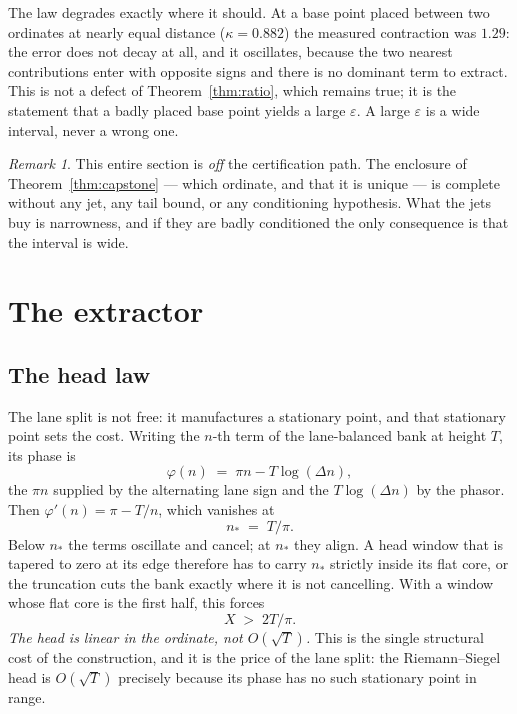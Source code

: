 \documentclass[11pt]{article}
\theoremstyle{plain}
\theoremstyle{definition}
\theoremstyle{remark}
\newtheorem{remark}[theorem]{Remark}
\begin{document}
The law degrades exactly where it should. At a base point placed between two ordinates
at nearly equal distance ($\kappa=0.882$) the measured contraction was $1.29$: the
error does not decay at all, and it oscillates, because the two nearest contributions
enter with opposite signs and there is no dominant term to extract. This is not a
defect of Theorem~\ref{thm:ratio}, which remains true; it is the statement that a
badly placed base point yields a large $\varepsilon$. A large $\varepsilon$ is a wide
interval, never a wrong one.

\begin{remark}
This entire section is \emph{off} the certification path. The enclosure of
Theorem~\ref{thm:capstone} --- which ordinate, and that it is unique --- is complete
without any jet, any tail bound, or any conditioning hypothesis. What the jets buy is
narrowness, and if they are badly conditioned the only consequence is that the
interval is wide.
\end{remark}

\section{The extractor}\label{sec:extractor}

\subsection{The head law}
The lane split is not free: it manufactures a stationary point, and that stationary
point sets the cost. Writing the $n$-th term of the lane-balanced bank at height $T$,
its phase is
\[
  \varphi(n)\;=\;\pi n-T\log(\Delta n),
\]
the $\pi n$ supplied by the alternating lane sign and the $T\log(\Delta n)$ by the
phasor. Then $\varphi'(n)=\pi-T/n$, which vanishes at
\[
  n_\ast \;=\; T/\pi .
\]
Below $n_\ast$ the terms oscillate and cancel; at $n_\ast$ they align. A head window
that is tapered to zero at its edge therefore has to carry $n_\ast$ strictly inside its
flat core, or the truncation cuts the bank exactly where it is not cancelling. With a
window whose flat core is the first half, this forces
\[
  X \;>\; 2T/\pi .
\]
\emph{The head is linear in the ordinate, not $O(\sqrt T)$.} This is the single
structural cost of the construction, and it is the price of the lane split: the
Riemann--Siegel head is $O(\sqrt T)$ precisely because its phase has no such
stationary point in range.
\end{document}
